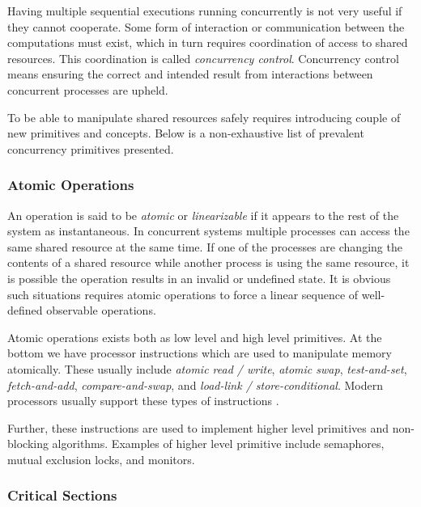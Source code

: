 Having multiple sequential executions running concurrently is not very useful if they cannot cooperate. Some form of interaction or communication between the computations must exist, which in turn requires coordination of access to shared resources. This coordination is called \textit{concurrency control}. Concurrency control means ensuring the correct and intended result from interactions between concurrent processes are upheld. 

To be able to manipulate shared resources safely requires introducing couple of new primitives and concepts. Below is a non\hyp{}exhaustive list of prevalent concurrency primitives presented.


\subsubsection{Atomic Operations}


An operation is said to be \textit{atomic} or \textit{linearizable} if it appears to the rest of the system as instantaneous. In concurrent systems multiple processes can access the same shared resource at the same time. If one of the processes are changing the contents of a shared resource while another process is using the same resource, it is possible the operation results in an invalid or undefined state. It is obvious such situations requires atomic operations to force a linear sequence of well\hyp{}defined observable operations. 

Atomic operations exists both as low level and high level primitives. At the bottom we have processor instructions which are used to manipulate memory atomically. These usually include \textit{atomic read / write}, \textit{atomic swap}, \textit{test\hyp{}and\hyp{}set}, \textit{fetch\hyp{}and\hyp{}add}, \textit{compare\hyp{}and\hyp{}swap}, and \textit{load\hyp{}link / store\hyp{}conditional}. Modern processors usually support these types of instructions \citep{buck2009atomic}.

Further, these instructions are used to implement higher level primitives and non\hyp{}blocking algorithms. Examples of higher level primitive include semaphores, mutual exclusion locks, and monitors.


\subsubsection{Critical Sections}


